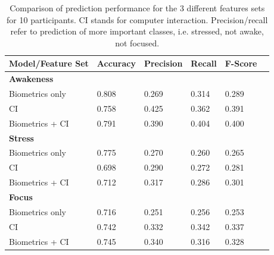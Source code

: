 \begin{table}
\begin{center}
\begin{tabularx}{\columnwidth}{llllll}
\hline
Model/Feature Set & Accuracy & Precision & Recall & F-Score\\
\hline
\textbf{Awakeness}\\
\hspace{3mm}Biometrics only & 0.808 & 0.269 & 0.314 & 0.289\\
\hspace{3mm}CI  & 0.758 & 0.425 & 0.362 & 0.391\\
\hspace{3mm}Biometrics + CI & 0.791 & 0.390 & 0.404 & 0.400\\
\hline
\textbf{Stress}\\
\hspace{3mm}Biometrics only & 0.775 & 0.270 &	0.260 & 0.265\\
\hspace{3mm}CI  & 0.698 & 0.290 & 0.272 & 0.281\\
\hspace{3mm}Biometrics + CI & 0.712 & 0.317 & 0.286 & 0.301\\
\hline
\textbf{Focus}\\
\hspace{3mm}Biometrics only & 0.716 & 0.251 & 0.256 & 0.253\\
\hspace{3mm}CI  & 0.742 & 0.332 & 0.342 & 0.337\\
\hspace{3mm}Biometrics + CI & 0.745 & 0.340 & 0.316 & 0.328\\
\hline
\end{tabularx}
\caption{Comparison of prediction performance for the 3 different features sets for 10 participants. CI stands for computer interaction.  Precision/recall refer to prediction of more important classes, i.e. stressed, not awake, not focused.}
\label{ciPerformance}
\end{center}
\vspace*{-7mm}
\end{table}

